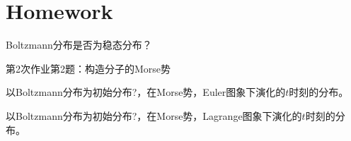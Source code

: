     \section{Homework}
    \begin{asg}
        Boltzmann分布是否为稳态分布？
    \end{asg}
    \begin{asg}
        第2次作业第2题：构造分子的Morse势
    \end{asg}
    \begin{asg}
        以Boltzmann分布为初始分布?，在Morse势，Euler图象下演化的$t$时刻的分布。
    \end{asg}
    \begin{asg}
        以Boltzmann分布为初始分布?，在Morse势，Lagrange图象下演化的$t$时刻的分布。
    \end{asg}

    
    